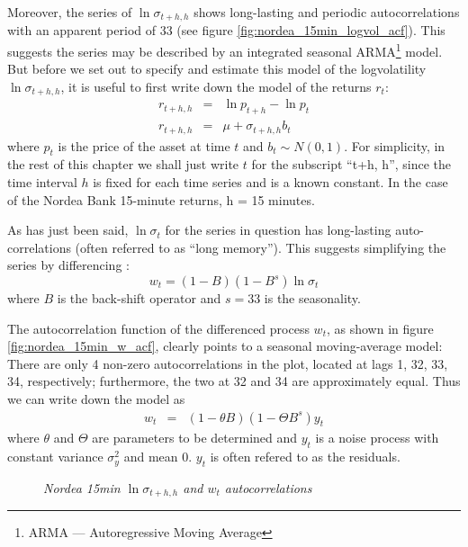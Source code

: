 Moreover, the series of $\ln\sigma_{t+h, h}$ shows long-lasting and
periodic autocorrelations with an apparent period of 33 (see figure
\ref{fig:nordea_15min_logvol_acf}). This suggests the series may be
described by an integrated seasonal ARMA\footnote{ARMA ---
  Autoregressive Moving Average} model. But before we set out
to specify and estimate this model of the logvolatility
$\ln\sigma_{t+h, h}$, it is useful to first write down the model of
the returns $r_t$:
\begin{eqnarray}
   r_{t+h, h} &=& \ln p_{t+h} - \ln p_t \nonumber \\
   r_{t+h, h} &=& \mu + \sigma_{t+h, h} b_t \label{eq:SLV_spec}
\end{eqnarray}
where $p_t$ is the price of the asset at time $t$ and $b_t \sim N(0,
1)$. For simplicity, in the rest of this chapter we shall just write
$t$ for the subscript ``t+h, h'', since the time interval $h$ is fixed
for each time series and is a known constant. In the case of the
Nordea Bank 15-minute returns, h = 15 minutes.

As has just been said, $\ln \sigma_t$ for the series in question has
long-lasting auto-correlations (often referred to as ``long
memory''). This suggests simplifying the series by differencing
\cite{BoxJenkins94}:
\[
w_t = (1-B)(1-B^s)\ln\sigma_t
\]
where $B$ is the back-shift operator and $s=33$ is the seasonality.

The autocorrelation function of the differenced process $w_t$, as shown in
figure \ref{fig:nordea_15min_w_acf}, clearly points to a seasonal
moving-average model: There are only 4 non-zero autocorrelations in
the plot, located at lags 1, 32, 33, 34, respectively; furthermore,
the two at 32 and 34 are approximately equal. Thus we can write down
the model as
\begin{eqnarray}
  w_t &=& (1 - \theta B)(1 - \Theta B^s) y_t \label{eq:nordea_w}
\end{eqnarray}
where $\theta$ and $\Theta$ are parameters to be determined and $y_t$
is a noise process with constant variance $\sigma_y^2$ and mean
0. $y_t$ is often refered to as the residuals.
\begin{figure}[htb!]
  \centering
  \caption{\small \it Nordea 15min $\ln\sigma_{t+h, h}$ and $w_t$
    autocorrelations}
\end{figure}

